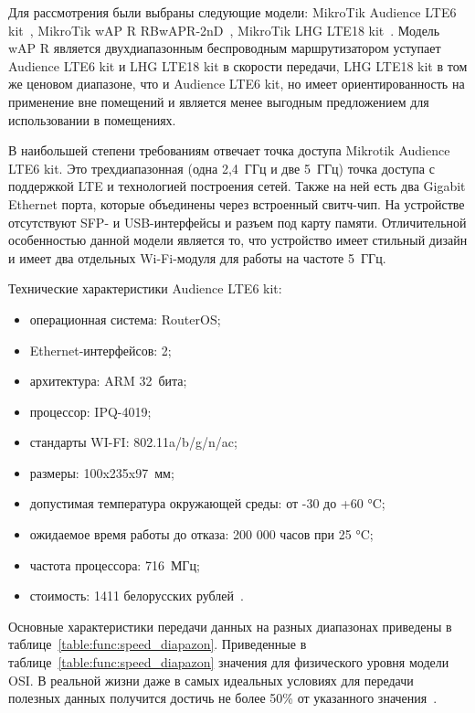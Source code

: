 Для рассмотрения были выбраны следующие модели: MikroTik Audience LTE6 kit~\cite{audiencelte6kit}, MikroTik wAP R RBwAPR-2nD~\cite{rbwapr2nd}, MikroTik LHG LTE18 kit~\cite{lhglte18kit}. Модель wAP R является двухдиапазонным беспроводным маршрутизатором уступает Audience LTE6 kit и LHG LTE18 kit в скорости передачи, LHG LTE18 kit в том же ценовом диапазоне, что и Audience LTE6 kit, но имеет ориентированность на применение вне помещений и является менее выгодным предложением для использовании в помещениях.

В наибольшей степени требованиям отвечает точка доступа Mikrotik Audience LTE6 kit. Это трехдиапазонная (одна 2,4~ГГц и две 5~ГГц) точка доступа с поддержкой LTE и технологией построения сетей. Также на ней есть два Gigabit Ethernet порта, которые объединены через встроенный свитч-чип. На устройстве отсутствуют SFP- и USB-интерфейсы и разъем под карту памяти. Отличительной особенностью данной модели является то, что устройство имеет стильный дизайн и имеет два отдельных Wi-Fi-модуля для работы на частоте 5~ГГц. 

Технические характеристики Audience LTE6 kit:

\begin{itemize}
    \item операционная система: RouterOS;
    \item Ethernet-интерфейсов: 2;
    \item архитектура: ARM 32~бита;
    \item процессор: IPQ-4019;
    \item стандарты WI-FI: 802.11a/b/g/n/ac;
    \item размеры: 100x235x97~мм;
    \item допустимая температура окружающей среды: от -30 до +60 °C;
    \item ожидаемое время работы до отказа: 200 000 часов при 25 °C;
    \item частота процессора: 716~МГц;
    \item стоимость: 1411 белорусских рублей~\cite{audiencelte6kit}.
\end{itemize}

Основные характеристики передачи данных на разных диапазонах приведены в таблице~\ref{table:func:speed_diapazon}. Приведенные в таблице~\ref{table:func:speed_diapazon} значения для физического уровня модели OSI. В реальной жизни даже в самых идеальных условиях для передачи полезных данных получится достичь не более 50\% от указанного значения~\cite{real_speed}.


